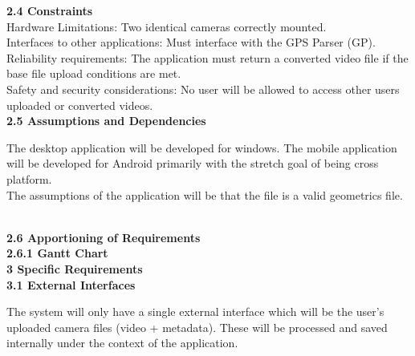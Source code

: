 \documentclass[10pt,draftclsnofoot,onecolumn]{IEEEtran}
\begin{document}
			\vspace{5mm}

		{\Medium\textbf{2.4 Constraints}} \\
			\vspace{5mm}
Hardware Limitations: Two identical cameras correctly mounted.\\
			\vspace{2mm}
Interfaces to other applications: Must interface with the GPS Parser (GP).\\
	\vspace{2mm}
Reliability requirements: The application must return a converted video file if the base file upload conditions are met.\\
	\vspace{2mm}
Safety and security considerations: No user will be allowed to access other users uploaded or converted videos.\\
			\vspace{5mm}
		{\Medium\textbf{2.5 Assumptions and Dependencies}} \\
					\vspace{5mm}

        The desktop application will be developed for windows. The mobile application will be developed for Android primarily with the stretch goal of being cross platform.\\
        	\vspace{2mm}
The assumptions of the application will be that the file is a valid geometrics file. 
        
        \\
        			\vspace{5mm}
{\Medium\textbf{2.6 Apportioning of Requirements}} \\
					\vspace{5mm}
{\Medium\textbf{2.6.1 Gantt Chart}} \\

        
        			\vspace{5mm}
{\Large\textbf{3 Specific Requirements}}\\
\vspace{5mm}
{\Medium\textbf{3.1 External Interfaces}} \\
\vspace{5mm}

The system will only have a single external interface which will be the user’s uploaded camera files (video + metadata). These will be processed and saved internally under the context of the application.\\
\vspace{2mm}
\end{document}

